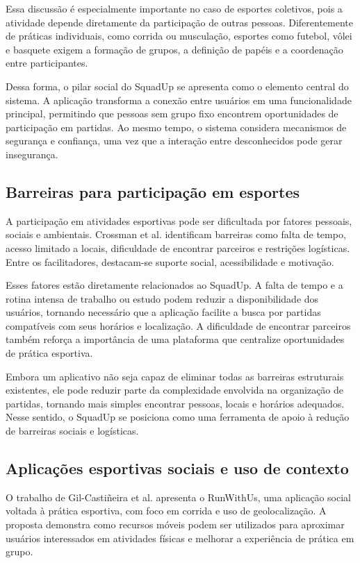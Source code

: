 \documentclass[a4paper, 12pt]{article}
\begin{document}
\begin{justify}
Essa discussão é especialmente importante no caso de esportes coletivos, pois a atividade depende diretamente da participação de outras pessoas. Diferentemente de práticas individuais, como corrida ou musculação, esportes como futebol, vôlei e basquete exigem a formação de grupos, a definição de papéis e a coordenação entre participantes.

Dessa forma, o pilar social do SquadUp se apresenta como o elemento central do sistema. A aplicação transforma a conexão entre usuários em uma funcionalidade principal, permitindo que pessoas sem grupo fixo encontrem oportunidades de participação em partidas. Ao mesmo tempo, o sistema considera mecanismos de segurança e confiança, uma vez que a interação entre desconhecidos pode gerar insegurança.

\subsection{Barreiras para participação em esportes}

A participação em atividades esportivas pode ser dificultada por fatores pessoais, sociais e ambientais. Crossman et al. \citep{crossman_facilitators_2024} identificam barreiras como falta de tempo, acesso limitado a locais, dificuldade de encontrar parceiros e restrições logísticas. Entre os facilitadores, destacam-se suporte social, acessibilidade e motivação.

Esses fatores estão diretamente relacionados ao SquadUp. A falta de tempo e a rotina intensa de trabalho ou estudo podem reduzir a disponibilidade dos usuários, tornando necessário que a aplicação facilite a busca por partidas compatíveis com seus horários e localização. A dificuldade de encontrar parceiros também reforça a importância de uma plataforma que centralize oportunidades de prática esportiva.

Embora um aplicativo não seja capaz de eliminar todas as barreiras estruturais existentes, ele pode reduzir parte da complexidade envolvida na organização de partidas, tornando mais simples encontrar pessoas, locais e horários adequados. Nesse sentido, o SquadUp se posiciona como uma ferramenta de apoio à redução de barreiras sociais e logísticas.

\subsection{Aplicações esportivas sociais e uso de contexto}

O trabalho de Gil-Castiñeira et al. \citep{gil-castineira_runwithus_2011} apresenta o RunWithUs, uma aplicação social voltada à prática esportiva, com foco em corrida e uso de geolocalização. A proposta demonstra como recursos móveis podem ser utilizados para aproximar usuários interessados em atividades físicas e melhorar a experiência de prática em grupo.


\end{justify}
\end{document}
